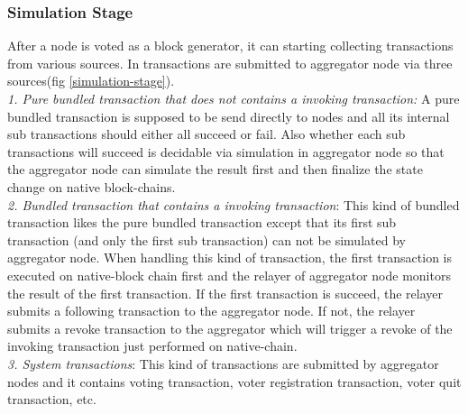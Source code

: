 \documentclass[pageno]{jpaper}
\begin{document}
\subsubsection{Simulation Stage}
After a node is voted as a block generator, it can starting collecting transactions from various sources. In \dprotocol transactions are submitted to aggregator node via three sources(fig \ref{simulation-stage}).\\
\newline
\textit{1. Pure bundled transaction that does not contains a invoking transaction:} A pure bundled transaction is supposed to be send directly to \dprotocol nodes and all its internal sub transactions should either all succeed or fail. Also whether each sub transactions will succeed is decidable via simulation in aggregator node so that the aggregator node can simulate the result first and then finalize the state change on native block-chains.\\
\newline
\textit{2. Bundled transaction that contains a invoking transaction}: This kind of bundled transaction likes the pure bundled transaction except that its first sub transaction (and only the first sub transaction) can not be simulated by aggregator node. When handling this kind of transaction, the first transaction is executed on native-block chain first and the relayer of aggregator node monitors the result of the first transaction. If the first transaction is succeed, the relayer submits a following transaction to the aggregator node. If not, the relayer submits a revoke transaction to the aggregator which will trigger a revoke of the invoking transaction just performed on native-chain.\\
\newline
\textit{3. System transactions}: This kind of transactions are submitted by aggregator nodes and it contains voting transaction, voter registration transaction, voter quit transaction, etc.
\end{document}
